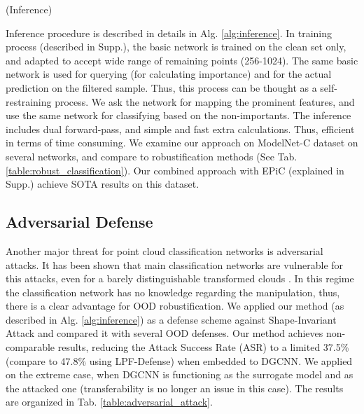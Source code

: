 \documentclass[10pt,twocolumn,letterpaper]{article}
\begin{document}
\begin{algorithm}
\caption{ (Inference)}\label{alg:inference}
\begin{algorithmic}
\Require{} 
\State {}
\State  {}
\State  {}
\State 
\State 
\State   {}
\State 
\State  {}
\State 

\end{algorithmic}
\end{algorithm}
Inference procedure is described in details in Alg. \ref{alg:inference}. In training process (described in Supp.), the basic network is trained on the clean set only, and adapted to accept wide range of remaining points (256-1024). The same basic network is used for querying  (for calculating importance) and for the actual prediction on the filtered sample. Thus, this process can be thought as a self-restraining process. We ask the network for mapping the prominent features, and use the same network for classifying based on the non-importants. The inference includes dual forward-pass, and simple and fast extra calculations. Thus, efficient in terms of time consuming. We examine our approach on ModelNet-C\cite{modelnet_c} dataset on several networks, and compare to robustification methods (See Tab. \ref{table:robust_classification}). Our combined approach with EPiC \cite{epic} (explained in Supp.) achieve SOTA results on this dataset.
















\subsection{Adversarial Defense}


Another major threat for point cloud classification networks is adversarial attacks. It has been shown that main classification networks are vulnerable for this attacks, even for a barely distinguishable transformed clouds \cite{shape_invariant, saliency_maps}. In this regime the classification network has no knowledge regarding the manipulation, thus, there is a clear advantage for OOD robustification. We applied our method (as described in Alg. \ref{alg:inference}) as a defense scheme against Shape-Invariant Attack\cite{shape_invariant} and compared it with several OOD defenses. Our method achieves non-comparable results, reducing the Attack Success Rate (ASR) to a limited 37.5\% (compare to 47.8\% using LPF-Defense\cite{lpf_defense}) when embedded to DGCNN\cite{dgcnn}. We applied on the extreme case, when DGCNN is functioning as the surrogate model and as the attacked one (transferability is no longer an issue in this case). The results are organized in Tab. \ref{table:adversarial_attack}.
\end{document}
